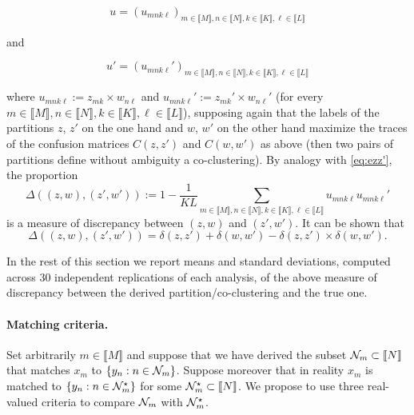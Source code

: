 \begin{equation*}
  u       =      (u_{mnk\ell})_{m\in\llbracket       M\rrbracket,n\in\llbracket
    N\rrbracket,k\in\llbracket  K\rrbracket,\ell\in\llbracket L\rrbracket}
\end{equation*}

and

\begin{equation*}
 u'      =      (u_{mnk\ell}')_{m\in\llbracket      M\rrbracket,n\in\llbracket
  N\rrbracket,k\in\llbracket K\rrbracket,\ell\in\llbracket L\rrbracket} 
\end{equation*}

where      $u_{mnk\ell}     :=      z_{mk}      \times     w_{n\ell}$      and
$u_{mnk\ell}'     :=     z_{mk}'     \times     w_{n\ell}'$     (for     every
$m\in\llbracket    M\rrbracket,   n\in\llbracket    N\rrbracket,k\in\llbracket
K\rrbracket,\ell\in\llbracket L\rrbracket$),  supposing again that  the labels
of the partitions  $z$, $z'$ on the one  hand and $w$, $w'$ on  the other hand
maximize the traces of the confusion matrices $C(z,z')$ and $C(w,w')$ as above
(then two  pairs of partitions  define without ambiguity a  co-clustering). By
analogy with \eqref{eq:ezz'}, the proportion
\begin{equation}
  \label{eq:Delta}
  \Delta((z,w),             (z',w'))             :=            1             -
  \frac{1}{KL}\sum_{m\in\llbracket M\rrbracket,n\in\llbracket N\rrbracket,k\in\llbracket K\rrbracket,\ell\in\llbracket L\rrbracket} u_{mnk\ell}u_{mnk\ell}'  
\end{equation}
is a  measure of discrepancy  between $(z,w)$ and  $(z',w')$. It can  be shown
that 
 \begin{equation}
   \Delta((z, w),  (z', w')) = \delta(z,  z') + \delta(w, w')  - \delta(z, z')
   \times \delta(w, w').
\end{equation}

In the rest of this section  we report means and standard deviations, computed
across 30 independent  replications of each analysis, of the  above measure of
discrepancy between the derived partition/co-clustering and the true one. 


\paragraph*{Matching criteria.}  Set arbitrarily $m  \in \llbracket M\rrbracket$ and suppose that
we have  derived the subset  $\mathcal{N}_{m} \subset  \llbracket N\rrbracket$ that matches  $x_{m}$ to
$\{y_{n} :  n \in \mathcal{N}_{m}\}$.  Suppose  moreover that in reality  $x_{m}$ is
matched    to   $\{y_{n}    :    n   \in    \mathcal{N}_{m}^{\star}\}$   for    some
$\mathcal{N}_{m}^{\star} \subset \llbracket N\rrbracket$.  We propose to use three real-valued criteria
to compare $\mathcal{N}_{m}$ with $\mathcal{N}_{m}^{\star}$.

